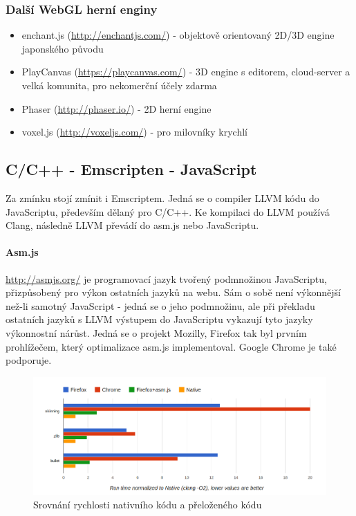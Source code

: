 \documentclass[12pt,a4paper,titlepage,final]{report}
\begin{document}
\subsubsection{Další WebGL herní enginy}
\begin{itemize}
	\item enchant.js (\url{http://enchantjs.com/}) - objektově orientovaný 2D/3D engine japonského původu
	\item PlayCanvas (\url{https://playcanvas.com/}) - 3D engine s editorem, cloud-server a velká komunita, pro nekomerční účely zdarma
	\item Phaser (\url{http://phaser.io/}) - 2D herní engine
	\item voxel.js (\url{http://voxeljs.com/}) - pro milovníky krychlí
\end{itemize}

\subsection{C/C++ - Emscripten - JavaScript}

Za zmínku stojí zmínit i Emscriptem. Jedná se o compiler LLVM kódu do JavaScriptu, především dělaný pro C/C++. Ke kompilaci do LLVM používá Clang, následně LLVM převádí do asm.js nebo JavaScriptu.

\paragraph{Asm.js} \url{http://asmjs.org/} je programovací jazyk tvořený podmnožinou JavaScriptu, přizpůsobený pro výkon ostatních jazyků na webu. Sám o sobě není výkonnější než-li samotný JavaScript - jedná se o jeho podmnožinu, ale při překladu ostatních jazyků s LLVM výstupem do JavaScriptu vykazují tyto jazyky výkonnostní nárůst. Jedná se o projekt Mozilly, Firefox tak byl prvním prohlížečem, který optimalizace asm.js implementoval. Google Chrome je také podporuje.

\begin{figure}[ht]
\begin{center}
\includegraphics[width=14cm]{images/micro3b.png}
\caption{Srovnání rychlosti nativního kódu a přeloženého kódu}
\label{fig:theory}
\end{center}
\end{figure}
\end{document}
